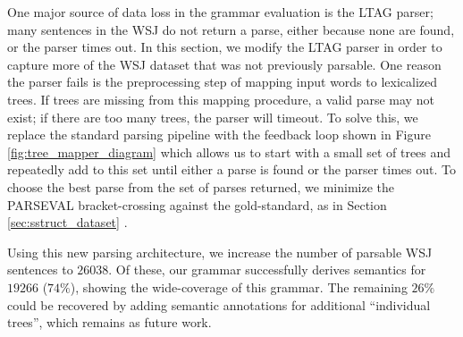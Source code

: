 \documentclass[11pt,a4paper]{article}
\begin{document}
One major source of data loss in the grammar evaluation is the LTAG parser; many sentences in the WSJ do not return a parse, either because none are found, or the parser times out. In this section, we modify the LTAG parser in order to capture more of the WSJ dataset that was not previously parsable. One reason the parser fails is the preprocessing step of mapping input words to lexicalized trees. If trees are missing from this mapping procedure, a valid parse may not exist; if there are too many trees, the parser will timeout. To solve this, we replace the standard parsing pipeline with the feedback loop shown in Figure \ref{fig:tree_mapper_diagram} which allows us to start with a small set of trees and repeatedly add to this set until either a parse is found or the parser times out. To choose the best parse from the set of parses returned, we minimize the PARSEVAL bracket-crossing against the gold-standard, as in Section \ref{sec:sstruct_dataset} \cite{parseval}.

Using this new parsing architecture, we increase the number of parsable WSJ sentences to $26038$. Of these, our grammar successfully derives semantics for $19266$ ($74\%$), showing the wide-coverage of this grammar. The remaining $26\%$ could be recovered by adding semantic annotations for additional ``individual trees'', which remains as future work.

%
%


\end{document}
